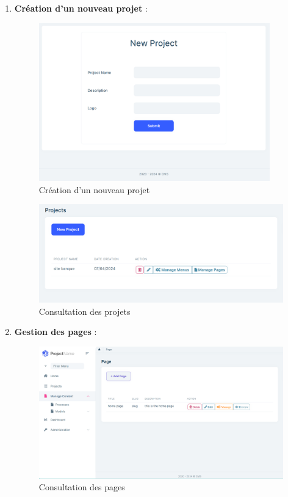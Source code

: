 \begin{enumerate}
    \item \textbf{Création d’un nouveau projet} :



          \begin{figure}[H]
              \centering
              \includegraphics[width=10cm]{Figures/new project.PNG}
              \caption{Création d'un nouveau projet}
          \end{figure}

          \begin{figure}[H]
              \centering
              \includegraphics[width=17cm]{Figures/list projects.PNG}
              \caption{Consultation des projets}
          \end{figure}



    \item \textbf{Gestion des pages} :

          \begin{figure}[H]
              \centering
              \includegraphics[width=17cm]{Figures/list pages.PNG}
              \caption{Consultation des pages}
          \end{figure}



\end{enumerate}
